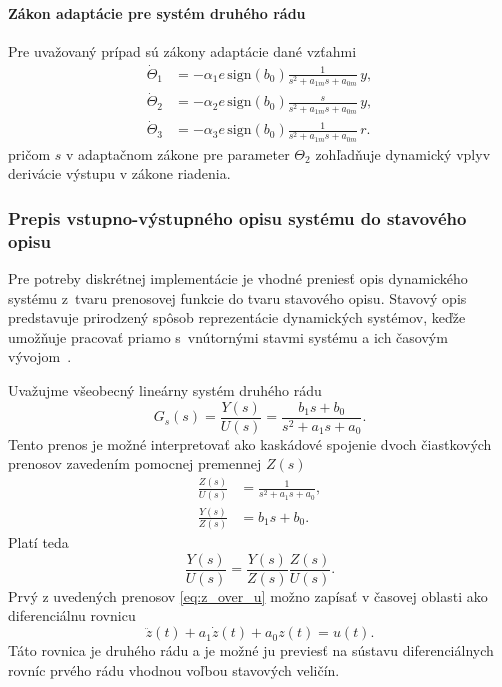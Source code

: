 \paragraph{Zákon adaptácie pre systém druhého rádu}

Pre uvažovaný prípad sú zákony adaptácie dané vzťahmi
\begin{align}
	\dot{\Theta}_1
	&=
	-\alpha_1 e \,
	\mathrm{sign}(b_0)
	\frac{1}{s^2 + a_{1m}s + a_{0m}}\,y,
	\label{eq:mrac_theta1_adapt}
	\\
	\dot{\Theta}_2
	&=
	-\alpha_2 e \,
	\mathrm{sign}(b_0)
	\frac{s}{s^2 + a_{1m}s + a_{0m}}\,y,
	\label{eq:mrac_theta2_adapt}
	\\
	\dot{\Theta}_3
	&=
	-\alpha_3 e \,
	\mathrm{sign}(b_0)
	\frac{1}{s^2 + a_{1m}s + a_{0m}}\,r.
	\label{eq:mrac_theta3_adapt}
\end{align}
pričom $s$ v adaptačnom zákone pre parameter $\Theta_2$
zohľadňuje dynamický vplyv derivácie výstupu
v zákone riadenia.

\subsubsection{Prepis vstupno-výstupného opisu systému do stavového opisu}
\label{sec:mrac_gradient_discrete}

Pre potreby diskrétnej implementácie je vhodné
preniesť opis dynamického systému z~tvaru prenosovej funkcie
do tvaru stavového opisu. Stavový opis predstavuje prirodzený spôsob
reprezentácie dynamických systémov, keďže umožňuje pracovať priamo
s~vnútornými stavmi systému a ich časovým vývojom~\cite{cellier1991,ogata2010}.

Uvažujme všeobecný lineárny systém druhého rádu
\begin{equation}
	G_s(s) = \frac{Y(s)}{U(s)}
	=
	\frac{b_1 s + b_0}{s^2 + a_1 s + a_0}.
	\label{eq:general_second_order_tf}
\end{equation}
Tento prenos je možné interpretovať ako kaskádové spojenie
dvoch čiastkových prenosov zavedením pomocnej premennej $Z(s)$
\begin{align}
	\frac{Z(s)}{U(s)}
	&=
	\frac{1}{s^2 + a_1 s + a_0},
	\label{eq:z_over_u}
	\\
	\frac{Y(s)}{Z(s)}
	&=
	b_1 s + b_0.
	\label{eq:y_over_z}
\end{align}
Platí teda
\begin{equation}
	\frac{Y(s)}{U(s)}
	=
	\frac{Y(s)}{Z(s)}
	\frac{Z(s)}{U(s)}.
\end{equation}
Prvý z uvedených prenosov
\eqref{eq:z_over_u}
možno zapísať v časovej oblasti ako diferenciálnu rovnicu
\begin{equation}
	\ddot{z}(t) + a_1 \dot{z}(t) + a_0 z(t) = u(t).
	\label{eq:z_diff_eq}
\end{equation}
Táto rovnica je druhého rádu a je možné ju previesť
na sústavu diferenciálnych rovníc prvého rádu
vhodnou voľbou stavových veličín.

